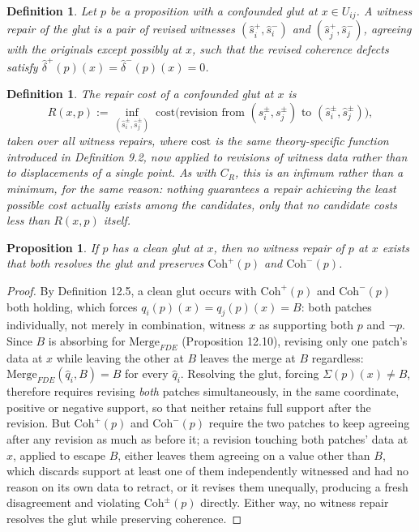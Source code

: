 \documentclass[11pt]{book}
\newtheorem{definition}[theorem]{Definition}
\newtheorem{proposition}[theorem]{Proposition}
\begin{document}
\begin{definition}
Let $p$ be a proposition with a confounded glut at $x \in U_{ij}$. A \emph{witness repair} of the glut is a pair of revised witnesses $(\hat s_i^+, \hat s_i^-)$ and $(\hat s_j^+, \hat s_j^-)$, agreeing with the originals except possibly at $x$, such that the revised coherence defects satisfy $\hat\delta^+(p)(x) = \hat\delta^-(p)(x) = 0$.
\end{definition}

\begin{definition}
The \emph{repair cost} of a confounded glut at $x$ is
\[
R(x, p) := \inf_{(\hat s_i^\pm, \hat s_j^\pm)} \; \mathrm{cost}\big(\text{revision from } (s_i^\pm, s_j^\pm) \text{ to } (\hat s_i^\pm, \hat s_j^\pm)\big),
\]
taken over all witness repairs, where $\mathrm{cost}$ is the same theory-specific function introduced in Definition 9.2, now applied to revisions of witness data rather than to displacements of a single point. As with $C_R$, this is an infimum rather than a minimum, for the same reason: nothing guarantees a repair achieving the least possible cost actually exists among the candidates, only that no candidate costs less than $R(x,p)$ itself.
\end{definition}

\begin{proposition}
If $p$ has a clean glut at $x$, then no witness repair of $p$ at $x$ exists that both resolves the glut and preserves $\mathrm{Coh}^+(p)$ and $\mathrm{Coh}^-(p)$.
\end{proposition}

\begin{proof}
By Definition 12.5, a clean glut occurs with $\mathrm{Coh}^+(p)$ and $\mathrm{Coh}^-(p)$ both holding, which forces $q_i(p)(x) = q_j(p)(x) = B$: both patches individually, not merely in combination, witness $x$ as supporting both $p$ and $\neg p$. Since $B$ is absorbing for $\mathrm{Merge}_{FDE}$ (Proposition 12.10), revising only one patch's data at $x$ while leaving the other at $B$ leaves the merge at $B$ regardless: $\mathrm{Merge}_{FDE}(\hat q_i, B) = B$ for every $\hat q_i$. Resolving the glut, forcing $\Sigma(p)(x) \neq B$, therefore requires revising \emph{both} patches simultaneously, in the same coordinate, positive or negative support, so that neither retains full support after the revision. But $\mathrm{Coh}^+(p)$ and $\mathrm{Coh}^-(p)$ require the two patches to keep agreeing after any revision as much as before it; a revision touching both patches' data at $x$, applied to escape $B$, either leaves them agreeing on a value other than $B$, which discards support at least one of them independently witnessed and had no reason on its own data to retract, or it revises them unequally, producing a fresh disagreement and violating $\mathrm{Coh}^\pm(p)$ directly. Either way, no witness repair resolves the glut while preserving coherence.
\end{proof}
\end{document}
